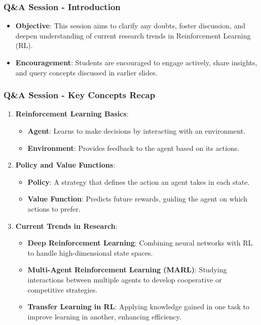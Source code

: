\documentclass[aspectratio=169]{beamer}
\begin{document}
\begin{frame}[fragile]
  \frametitle{Q\&A Session - Introduction}
  \begin{itemize}
    \item \textbf{Objective}: 
    This session aims to clarify any doubts, foster discussion, and deepen understanding of current research trends in Reinforcement Learning (RL).
    
    \item \textbf{Encouragement}: 
    Students are encouraged to engage actively, share insights, and query concepts discussed in earlier slides.
  \end{itemize}
\end{frame}

\begin{frame}[fragile]
  \frametitle{Q\&A Session - Key Concepts Recap}
  \begin{enumerate}
    \item \textbf{Reinforcement Learning Basics}:
    \begin{itemize}
      \item \textbf{Agent}: Learns to make decisions by interacting with an environment.
      \item \textbf{Environment}: Provides feedback to the agent based on its actions.
    \end{itemize}
    
    \item \textbf{Policy and Value Functions}:
    \begin{itemize}
      \item \textbf{Policy}: A strategy that defines the action an agent takes in each state.
      \item \textbf{Value Function}: Predicts future rewards, guiding the agent on which actions to prefer.
    \end{itemize}
    
    \item \textbf{Current Trends in Research}:
    \begin{itemize}
      \item \textbf{Deep Reinforcement Learning}: Combining neural networks with RL to handle high-dimensional state spaces.
      \item \textbf{Multi-Agent Reinforcement Learning (MARL)}: Studying interactions between multiple agents to develop cooperative or competitive strategies.
      \item \textbf{Transfer Learning in RL}: Applying knowledge gained in one task to improve learning in another, enhancing efficiency.
    \end{itemize}
  \end{enumerate}
\end{frame}
\end{document}
